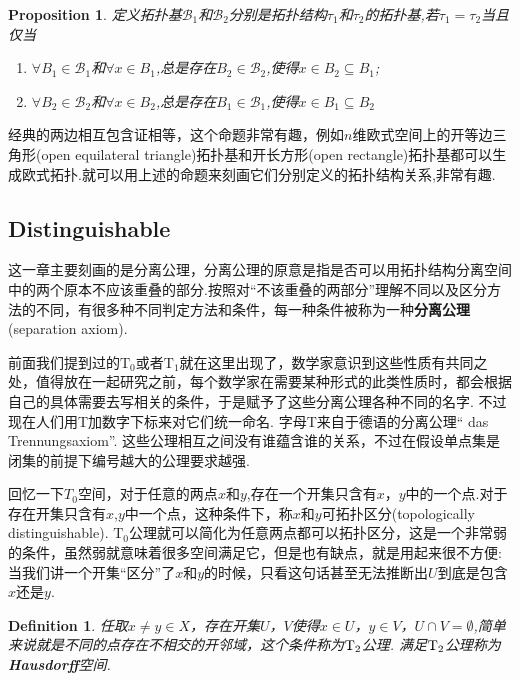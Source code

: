 \documentclass{article}
\newtheorem{proposition}[theorem]{Proposition}
\newtheorem{definition}[theorem]{Definition}
\begin{document}
\begin{proposition}
定义拓扑基$\mathscr{B}_1$和$\mathscr{B}_2$分别是拓扑结构$\tau_1$和$\tau_2$的拓扑基,若$\tau_1 = \tau_2$当且仅当
\begin{enumerate}
	\item $\forall B_1 \in \mathscr{B}_1$和$\forall x \in B_1$,总是存在$B_2 \in \mathscr{B}_2$,使得$x \in B_2 \subseteq B_1$;
	\item $\forall B_2 \in \mathscr{B}_2$和$\forall x \in B_2$,总是存在$B_1 \in \mathscr{B}_1$,使得$x \in B_1 \subseteq B_2$
\end{enumerate}
\end{proposition}

经典的两边相互包含证相等，这个命题非常有趣，例如$n$维欧式空间上的开等边三角形(open equilateral triangle)拓扑基和开长方形(open  rectangle)拓扑基都可以生成欧式拓扑.就可以用上述的命题来刻画它们分别定义的拓扑结构关系,非常有趣.

\newpage

\subsection{Distinguishable}

这一章主要刻画的是分离公理，分离公理的原意是指是否可以用拓扑结构分离空间中的两个原本不应该重叠的部分.按照对“不该重叠的两部分”理解不同以及区分方法的不同，有很多种不同判定方法和条件，每一种条件被称为一种\textbf{分离公理}(separation axiom).

前面我们提到过的$\text{T}_0$或者$\text{T}_1$就在这里出现了，数学家意识到这些性质有共同之处，值得放在一起研究之前，每个数学家在需要某种形式的此类性质时，都会根据自己的具体需要去写相关的条件，于是赋予了这些分离公理各种不同的名字. 不过现在人们用T加数字下标来对它们统一命名. 字母T来自于德语的分离公理“	das Trennungsaxiom”. 这些公理相互之间没有谁蕴含谁的关系，不过在假设单点集是闭集的前提下编号越大的公理要求越强. 

回忆一下$T_0$空间，对于任意的两点$x$和$y$,存在一个开集只含有$x$，$y$中的一个点.对于存在开集只含有$x$,$y$中一个点，这种条件下，称$x$和$y$可拓扑区分(topologically distinguishable). $\text{T}_0$公理就可以简化为任意两点都可以拓扑区分，这是一个非常弱的条件，虽然弱就意味着很多空间满足它，但是也有缺点，就是用起来很不方便: 当我们讲一个开集“区分”了$x$和$y$的时候，只看这句话甚至无法推断出$U$到底是包含$x$还是$y$.

\begin{definition}
任取$x \neq y \in X$，存在开集$U$，$V$使得$x \in U$，$y \in V$，$U \cap V = \emptyset$,简单来说就是不同的点存在不相交的开邻域，这个条件称为$\rm T_2$公理. 满足$\rm T_2$公理称为\rm\textbf{Hausdorff}空间.
\end{definition}
\end{document}
